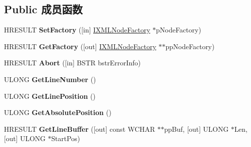 \subsection*{Public 成员函数}
\begin{DoxyCompactItemize}
\item 
\mbox{\label{interface_x_m_l_p_s_r_1_1_i_x_m_l_node_source_a8d63439255a6b0c63d3a7675d350f2be}} 
H\+R\+E\+S\+U\+LT {\bfseries Set\+Factory} (\mbox{[}in\mbox{]} \hyperlink{interface_x_m_l_p_s_r_1_1_i_x_m_l_node_factory}{I\+X\+M\+L\+Node\+Factory} $\ast$p\+Node\+Factory)
\item 
\mbox{\label{interface_x_m_l_p_s_r_1_1_i_x_m_l_node_source_acfbb6d13b0467507ba19e5f96c063512}} 
H\+R\+E\+S\+U\+LT {\bfseries Get\+Factory} (\mbox{[}out\mbox{]} \hyperlink{interface_x_m_l_p_s_r_1_1_i_x_m_l_node_factory}{I\+X\+M\+L\+Node\+Factory} $\ast$$\ast$pp\+Node\+Factory)
\item 
\mbox{\label{interface_x_m_l_p_s_r_1_1_i_x_m_l_node_source_a701e95dec017b8573289b89cbc2b5516}} 
H\+R\+E\+S\+U\+LT {\bfseries Abort} (\mbox{[}in\mbox{]} B\+S\+TR bstr\+Error\+Info)
\item 
\mbox{\label{interface_x_m_l_p_s_r_1_1_i_x_m_l_node_source_aee35b4fab088cd2114b4d090c9b188a8}} 
U\+L\+O\+NG {\bfseries Get\+Line\+Number} ()
\item 
\mbox{\label{interface_x_m_l_p_s_r_1_1_i_x_m_l_node_source_a967dfb8b3a28e3685ca4307910d25ff0}} 
U\+L\+O\+NG {\bfseries Get\+Line\+Position} ()
\item 
\mbox{\label{interface_x_m_l_p_s_r_1_1_i_x_m_l_node_source_ad5d25acbe2b002dd75907189038b7b3e}} 
U\+L\+O\+NG {\bfseries Get\+Absolute\+Position} ()
\item 
\mbox{\label{interface_x_m_l_p_s_r_1_1_i_x_m_l_node_source_a6da08fc067b80b8325d854aaf9cec82e}} 
H\+R\+E\+S\+U\+LT {\bfseries Get\+Line\+Buffer} (\mbox{[}out\mbox{]} const W\+C\+H\+AR $\ast$$\ast$pp\+Buf, \mbox{[}out\mbox{]} U\+L\+O\+NG $\ast$Len, \mbox{[}out\mbox{]} U\+L\+O\+NG $\ast$Start\+Pos)

\end{DoxyCompactItemize}
